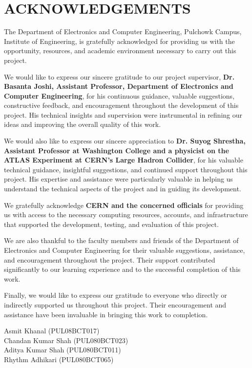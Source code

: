 \documentclass[12pt, a4paper]{report}
\begin{document}
\chapter*{ACKNOWLEDGEMENTS}
The Department of Electronics and Computer Engineering, Pulchowk Campus,
Institute of Engineering, is gratefully acknowledged for providing us with the
opportunity, resources, and academic environment necessary to carry out this
project.

We would like to express our sincere gratitude to our project supervisor,
\textbf{Dr. Basanta Joshi, Assistant Professor, Department of Electronics and
Computer Engineering}, for his continuous guidance, valuable suggestions,
constructive feedback, and encouragement throughout the development of this
project. His technical insights and supervision were instrumental in refining
our ideas and improving the overall quality of this work.

We would also like to express our sincere appreciation to
\textbf{Dr. Suyog Shrestha, Assistant Professor at Washington College and a
physicist on the ATLAS Experiment at CERN's Large Hadron Collider}, for his
valuable technical guidance, insightful suggestions, and continued support
throughout this project. His expertise and assistance were particularly
valuable in helping us understand the technical aspects of the project and in
guiding its development.

We gratefully acknowledge \textbf{CERN and the concerned officials} for
providing us with access to the necessary computing resources, accounts, and
infrastructure that supported the development, testing, and evaluation of this
project.

We are also thankful to the faculty members and friends of the Department of
Electronics and Computer Engineering for their valuable suggestions,
assistance, and encouragement throughout the project. Their support
contributed significantly to our learning experience and to the successful
completion of this work.

Finally, we would like to express our gratitude to everyone who directly or
indirectly supported us throughout this project. Their encouragement and
assistance have been invaluable in bringing this work to completion.

\vspace{0.6cm}
\begin{flushright}
Asmit Khanal (PUL08BCT017)\\
Chandan Kumar Shah (PUL080BCT023)\\
Aditya Kumar Shah (PUL080BCT011)\\
Rhythm Adhikari (PUL080BCT065)
\end{flushright}
\newpage
\end{document}
